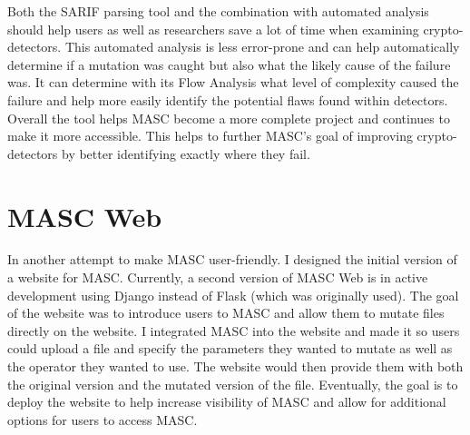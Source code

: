 Both the SARIF parsing tool and the combination with automated analysis should help users as well as researchers save a lot of time when examining crypto-detectors. This automated analysis is less error-prone and can help automatically determine if a mutation was caught but also what the likely cause of the failure was. It can determine with its Flow Analysis what level of complexity caused the failure and help more easily identify the potential flaws found within detectors. Overall the tool helps MASC become a more complete project and continues to make it more accessible. This helps to further MASC’s goal of improving crypto-detectors by better identifying exactly where they fail. 

\section{MASC Web}
\label{ch3:subsec:web}

In another attempt to make MASC user-friendly. I designed the initial version of a website for MASC. Currently, a second version of MASC Web is in active development using Django instead of Flask (which was originally used). The goal of the website was to introduce users to MASC and allow them to mutate files directly on the website. I integrated MASC into the website and made it so users could upload a file and specify the parameters they wanted to mutate as well as the operator they wanted to use. The website would then provide them with both the original version and the mutated version of the file. Eventually, the goal is to deploy the website to help increase visibility of MASC and allow for additional options for users to access MASC.


